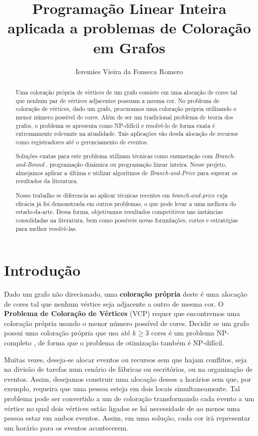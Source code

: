 \documentclass[11pt]{article}
\author{Ieremies Vieira da Fonseca Romero}
\date{}
\title{Programação Linear Inteira aplicada a problemas de Coloração em Grafos}
\begin{document}
\maketitle
\begin{abstract}
Uma coloração própria de vértices de um grafo consiste em uma alocação de cores tal que nenhum par de vértices adjacentes possuam a mesma cor.
No problema de coloração de vértices, dado um grafo, procuramos uma coloração própria utilizando o menor número possível de cores.
Além de ser um tradicional problema de teoria dos grafos, o problema se apresenta como NP-difícil e resolvê-lo de forma exata é extremamente relevante na atualidade.
Tais aplicações vão desda alocação de recursos como registradores até o gerenciamento de eventos.

Soluções exatas para este problema utilizam técnicas como enumeração com \emph{Branch-and-Bound} \autocite{Furini2016ImprovedDSATURBased}, programação dinâmica \autocites{Eppstein2003SmallMaximalIndependent}[][]{Byskov2002ChromaticNumberTime} ou programação linear inteira.
Nesse projeto, almejamos aplicar a última e utilizar algoritmos de \emph{Branch-and-Price} para superar os resultados da literatura.

Nosso trabalho se diferencia ao aplicar técnicas recentes em \emph{branch-and-price} \autocites{Pessoa2021SolvingBinPacking}[][]{Lima2022Exactsolutionnetwork} cuja eficácia já foi demonstrada em outros problemas, o que pode levar a uma melhora do estado-da-arte.
Dessa forma, objetivamos resultados competitivos nas instâncias consolidadas na literatura, bem como possíveis novas formulações, cortes e estratégias para melhor resolvê-las.
\end{abstract}

\section{Introdução}
\label{sec:org9851288}
Dado um grafo não direcionado, uma \textbf{coloração própria} deste é uma alocação de cores tal que nenhum vértice seja adjacente a outro de mesma cor.
O \textbf{Problema de Coloração de Vértices} (VCP) requer que encontremos uma coloração própria usando o menor número possível de cores.
Decidir se um grafo possui uma coloração própria que usa até \(k \geq 3\) cores é um problema NP-completo \autocite{Garey1979ComputersIntractabilityGuide}, de forma que o problema de otimização também é NP-difícil.

Muitas vezes, deseja-se alocar eventos ou recursos sem que hajam conflitos, seja na divisão de tarefas num cenário de fábricas ou escritórios, ou na organização de eventos.
Assim, desejamos construir uma alocação desses a horários sem que, por exemplo, requeira que uma pessoa esteja em dois locais simultaneamente.
Tal problema pode ser convertido a um de coloração transformando cada evento a um vértice no qual dois vértices estão ligados se há necessidade de ao menos uma pessoa estar em ambos eventos.
Assim, em uma solução, cada cor irá representar um horário para os eventos acontecerem.
\end{document}
